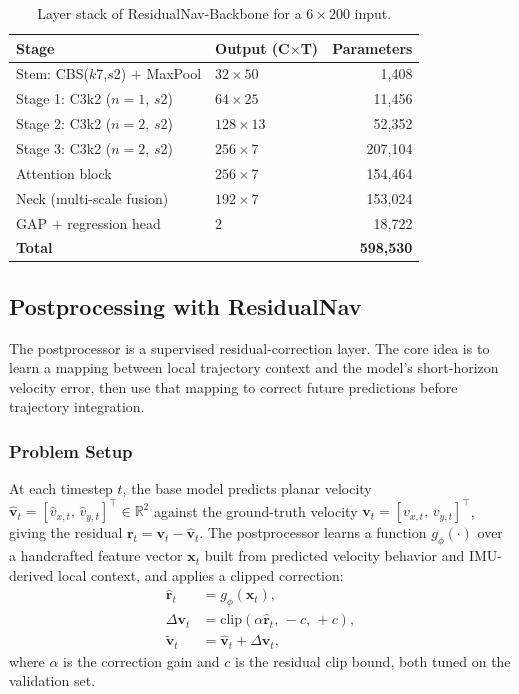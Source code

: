 \documentclass[10pt,conference,letterpaper]{IEEEtran}
\begin{document}
\begin{table}[htbp]
\caption{Layer stack of ResidualNav-Backbone for a $6\times200$ input.}
\label{tab:yolo_arch}
\centering
\scriptsize
\begin{tabular}{|l|l|r|}
\hline
\textbf{Stage} & \textbf{Output (C$\times$T)} & \textbf{Parameters} \\
\hline
Stem: CBS($k$7,$s$2) $+$ MaxPool  & $32\times50$  & 1,408   \\
Stage 1: C3k2 ($n{=}1$, $s$2)     & $64\times25$  & 11,456  \\
Stage 2: C3k2 ($n{=}2$, $s$2)     & $128\times13$ & 52,352  \\
Stage 3: C3k2 ($n{=}2$, $s$2)     & $256\times7$  & 207,104 \\
Attention block                   & $256\times7$  & 154,464 \\
Neck (multi-scale fusion)         & $192\times7$  & 153,024 \\
GAP $+$ regression head           & $2$           & 18,722  \\
\hline
\textbf{Total}                    &               & \textbf{598,530} \\
\hline
\end{tabular}
\end{table}

\subsection{Postprocessing with ResidualNav}
The postprocessor is a supervised residual-correction layer. The
core idea is to learn a mapping between local trajectory
context and the model's short-horizon velocity error, then use that
mapping to correct future predictions before trajectory integration.

\subsubsection{Problem Setup}

At each timestep $t$, the base model predicts planar velocity
$\hat{\mathbf{v}}_t = [\hat{v}_{x,t},\,\hat{v}_{y,t}]^\top \in \mathbb{R}^2$
against the ground-truth velocity $\mathbf{v}_t = [v_{x,t},\,v_{y,t}]^\top$,
giving the residual $\mathbf{r}_t = \mathbf{v}_t - \hat{\mathbf{v}}_t$. The
postprocessor learns a function $g_\phi(\cdot)$ over a handcrafted feature
vector $\mathbf{x}_t$ built from predicted velocity behavior and
IMU-derived local context, and applies a clipped correction:
\begin{align}
  \hat{\mathbf{r}}_t &= g_\phi(\mathbf{x}_t), \\
  \Delta \mathbf{v}_t &= \mathrm{clip}\!\left(\alpha \hat{\mathbf{r}}_t,\,-c,\,+c\right), \\
  \tilde{\mathbf{v}}_t &= \hat{\mathbf{v}}_t + \Delta \mathbf{v}_t,
\end{align}
where $\alpha$ is the correction gain and $c$ is the residual clip bound,
both tuned on the validation set.
\end{document}
